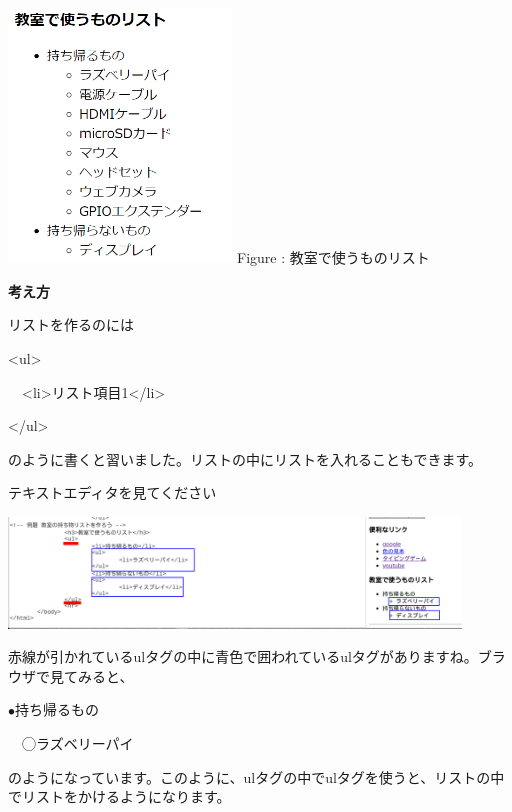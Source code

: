 \documentclass[a4paper,12pt]{jarticle}
\begin{document}
\bigskip
\centering
\begin{minipage}{5.937cm}
  {\upshape
    \includegraphics[width=5.937cm]{textbook-img203.png}
    \newline
    Figure : 教室で使うものリスト}
\end{minipage}

\bigskip
\flushleft

\textbf{考え方}



リストを作るのには

{\textless}ul{\textgreater}

\ \ {\textless}li{\textgreater}リスト項目1{\textless}/li{\textgreater}

{\textless}/ul{\textgreater}

のように書くと習いました。リストの中にリストを入れることもできます。

テキストエディタを見てください

\bigskip

\centering
\includegraphics[width=0.9\textwidth]{textbook-img204.png}

\bigskip
\flushleft

赤線が引かれているulタグの中に青色で囲われているulタグがありますね。ブラウザで見てみると、

${\bullet}持ち帰るもの$

\ \ ◯ラズベリーパイ

のようになっています。このように、ulタグの中でulタグを使うと、リストの中でリストをかけるようになります。
\end{document}

